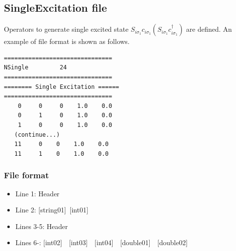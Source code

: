\newpage
\subsection{{SingleExcitation file}}
\label{Subsec:singleexcitation}
Operators to generate single excited state $S_{i\sigma_1}c_{i\sigma_1}(S_{i\sigma_1}c_{i\sigma_1}^{\dagger})$ are defined.
An example of file format is shown as follows.

\begin{minipage}{12.5cm}
\begin{screen}
\begin{verbatim}
===============================
NSingle         24
===============================
======== Single Excitation ======
===============================
    0     0     0    1.0    0.0
    0     1     0    1.0    0.0
    1     0     0    1.0    0.0
   (continue...)
   11     0    0    1.0    0.0
   11     1    0    1.0    0.0
\end{verbatim}
\end{screen}
\end{minipage}

\subsubsection{File format}
 \begin{itemize}
   \item  Line 1:  Header
   \item  Line 2:   [string01]~[int01]
   \item  Lines 3-5:  Header
   \item  Lines 6-: 
   [int02]~~[int03]~~[int04]~~[double01]~~[double02]
  \end{itemize}
